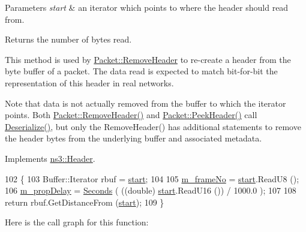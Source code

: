 \begin{DoxyParams}{Parameters}
{\em start} & an iterator which points to where the header should read from. \\
\hline
\end{DoxyParams}
\begin{DoxyReturn}{Returns}
the number of bytes read.
\end{DoxyReturn}
This method is used by \hyperlink{classns3_1_1Packet_a0961eccf975d75f902d40956c93ba63e}{Packet\+::\+Remove\+Header} to re-\/create a header from the byte buffer of a packet. The data read is expected to match bit-\/for-\/bit the representation of this header in real networks.

Note that data is not actually removed from the buffer to which the iterator points. Both \hyperlink{classns3_1_1Packet_a0961eccf975d75f902d40956c93ba63e}{Packet\+::\+Remove\+Header()} and \hyperlink{classns3_1_1Packet_aadc63487bea70945c418f4c3e9b81964}{Packet\+::\+Peek\+Header()} call \hyperlink{classns3_1_1UanHeaderRcData_aaf625fdde6c76e26dbd2a82438514011}{Deserialize()}, but only the Remove\+Header() has additional statements to remove the header bytes from the underlying buffer and associated metadata. 

Implements \hyperlink{classns3_1_1Header_a78be9400bb66b2a8543606f395ef5396}{ns3\+::\+Header}.


\begin{DoxyCode}
102 \{
103   Buffer::Iterator rbuf = \hyperlink{namespacevisualizer_1_1core_a2a35e5d8a34af358b508dac8635754e0}{start};
104 
105   \hyperlink{classns3_1_1UanHeaderRcData_a44293983565792b02d4ea8b16e565e93}{m\_frameNo} = \hyperlink{namespacevisualizer_1_1core_a2a35e5d8a34af358b508dac8635754e0}{start}.ReadU8 ();
106   \hyperlink{classns3_1_1UanHeaderRcData_a2064d62489ffb5549897e06f171f8f68}{m\_propDelay} = \hyperlink{group__timecivil_ga33c34b816f8ff6628e33d5c8e9713b9e}{Seconds} ( ((\textcolor{keywordtype}{double}) \hyperlink{namespacevisualizer_1_1core_a2a35e5d8a34af358b508dac8635754e0}{start}.ReadU16 ()) / 1000.0 );
107 
108   \textcolor{keywordflow}{return} rbuf.GetDistanceFrom (\hyperlink{namespacevisualizer_1_1core_a2a35e5d8a34af358b508dac8635754e0}{start});
109 \}
\end{DoxyCode}


Here is the call graph for this function\+:


